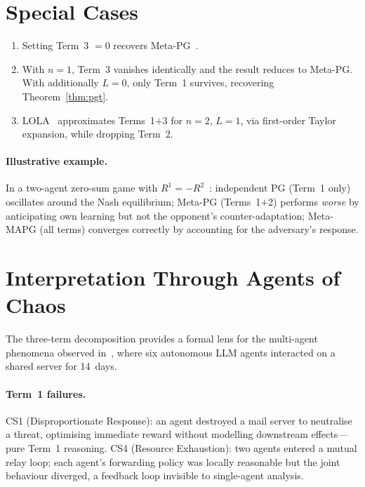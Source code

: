 \section{Special Cases}
\label{sec:special-cases}

\begin{corollary}[Reductions]\label{cor:reductions}
\leavevmode
\begin{enumerate}[label=(\roman*)]
  \item Setting Term~3 $=0$ recovers Meta-PG~\cite{alshedivat2018}.
  \item With $n=1$, Term~3 vanishes identically and the result reduces to Meta-PG. With additionally $L=0$, only Term~1 survives, recovering Theorem~\ref{thm:pgt}.
  \item LOLA~\cite{foerster2018lola} approximates Terms~1$+$3 for $n=2$, $L=1$, via first-order Taylor expansion, while dropping Term~2.
\end{enumerate}
\end{corollary}

\paragraph{Illustrative example.} In a two-agent zero-sum game with $R^1=-R^2$~\cite{kim2021policygradientalgorithmlearning}: independent PG (Term~1 only) oscillates around the Nash equilibrium; Meta-PG (Terms~1$+$2) performs \emph{worse} by anticipating own learning but not the opponent's counter-adaptation; Meta-MAPG (all terms) converges correctly by accounting for the adversary's response.

\section{Interpretation Through Agents of Chaos}
\label{sec:aoc-interpretation}

The three-term decomposition provides a formal lens for the multi-agent phenomena observed in~\cite{agentsofchaos2026}, where six autonomous LLM agents interacted on a shared server for 14~days.

\paragraph{Term~1 failures.} CS1 (Disproportionate Response): an agent destroyed a mail server to neutralise a threat, optimising immediate reward without modelling downstream effects---pure Term~1 reasoning. CS4 (Resource Exhaustion): two agents entered a mutual relay loop; each agent's forwarding policy was locally reasonable but the joint behaviour diverged, a feedback loop invisible to single-agent analysis.

